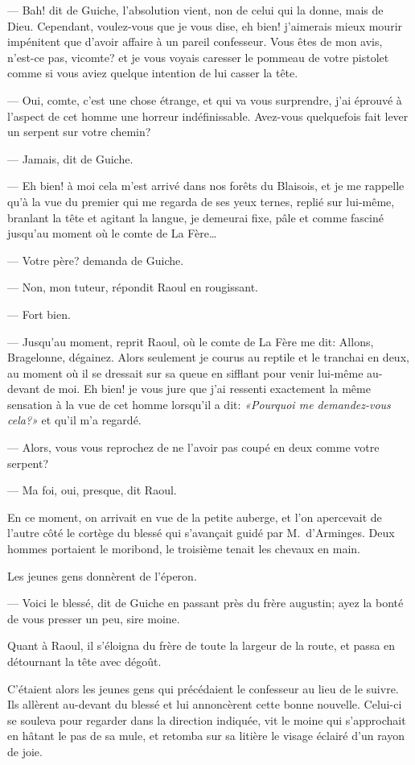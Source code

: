 — Bah! dit de Guiche, l'absolution vient, non de celui qui la donne, mais de Dieu. Cependant, voulez-vous que je vous dise, eh bien! j'aimerais mieux mourir impénitent que d'avoir affaire à un pareil confesseur. Vous êtes de mon avis, n'est-ce pas, vicomte? et je vous voyais caresser le pommeau de votre pistolet comme si vous aviez quelque intention de lui casser la tête.

— Oui, comte, c'est une chose étrange, et qui va vous surprendre, j'ai éprouvé à l'aspect de cet homme une horreur indéfinissable. Avez-vous quelquefois fait lever un serpent sur votre chemin?

— Jamais, dit de Guiche.

— Eh bien! à moi cela m'est arrivé dans nos forêts du Blaisois, et je me rappelle qu'à la vue du premier qui me regarda de ses yeux ternes, replié sur lui-même, branlant la tête et agitant la langue, je demeurai fixe, pâle et comme fasciné jusqu'au moment où le comte de La Fère\dots

— Votre père? demanda de Guiche.

— Non, mon tuteur, répondit Raoul en rougissant.

— Fort bien.

— Jusqu'au moment, reprit Raoul, où le comte de La Fère me dit: Allons, Bragelonne, dégainez. Alors seulement je courus au reptile et le tranchai en deux, au moment où il se dressait sur sa queue en sifflant pour venir lui-même au-devant de moi. Eh bien! je vous jure que j'ai ressenti exactement la même sensation à la vue de cet homme lorsqu'il a dit: \textit{«Pourquoi me demandez-vous cela?»} et qu'il m'a regardé.

— Alors, vous vous reprochez de ne l'avoir pas coupé en deux comme votre serpent?

— Ma foi, oui, presque, dit Raoul.

En ce moment, on arrivait en vue de la petite auberge, et l'on apercevait de l'autre côté le cortège du blessé qui s'avançait guidé par M.~d'Arminges. Deux hommes portaient le moribond, le troisième tenait les chevaux en main.

Les jeunes gens donnèrent de l'éperon.

— Voici le blessé, dit de Guiche en passant près du frère augustin; ayez la bonté de vous presser un peu, sire moine.

Quant à Raoul, il s'éloigna du frère de toute la largeur de la route, et passa en détournant la tête avec dégoût.

C'étaient alors les jeunes gens qui précédaient le confesseur au lieu de le suivre. Ils allèrent au-devant du blessé et lui annoncèrent cette bonne nouvelle. Celui-ci se souleva pour regarder dans la direction indiquée, vit le moine qui s'approchait en hâtant le pas de sa mule, et retomba sur sa litière le visage éclairé d'un rayon de joie.

